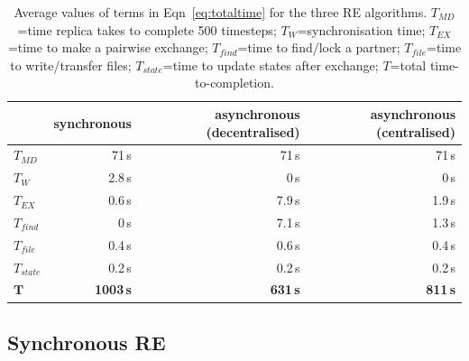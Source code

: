 \documentclass{rspublic}
\newcommand{\alnote}[1]{ {\textcolor{blue} { ***andre: #1 }}}
\newcommand{\athotanote}[1]{ {\textcolor{green} { ***athota: #1 }}}
\newcommand{\alnote}[1]{}
\newcommand{\athotanote}[1]{}
\begin{document}
\begin{table}
    \centering
	\begin{tabular}{|l|r|r|r|}
	\hline
	                        &\textbf{synchronous}  &\textbf{asynchronous (decentralised)} 
	                        &\textbf{asynchronous (centralised)}\\
	\hline
	\hline
	$T_{MD}$       &71\,s &71\,s &71\,s\\
	\hline
	\hline
	$T_{W}$        &2.8\,s &0\,s &0\,s\\
	\hline\hline
	$T_{EX}$        &0.6\,s &7.9\,s &1.9\,s\\
	\hline
	\hspace{2mm}$T_{find}$        &0\,s   &7.1\,s &1.3\,s\\
	\hline
	\hspace{2mm}$T_{file}$       &0.4\,s &0.6\,s &0.4\,s\\
	\hline
    \hspace{2mm}$T_{state}$    &0.2\,s &0.2\,s  &0.2\,s\\
	\hline
	\hline
	$\mathbf{T}$        &\textbf{1003\,s} &\textbf{631\,s}    &\textbf{811\,s}\\
	\hline
    \end{tabular}
    \caption{Average values of terms in Eqn~\ref{eq:totaltime} for the three RE algorithms. $T_{MD}$=time replica takes to complete 500 timesteps; $T_W$=synchronisation time; $T_{EX}$=time to make a pairwise exchange; $T_{find}$=time to find/lock a partner; $T_{file}$=time to write/transfer files; $T_{state}$=time to update states after exchange; $T$=total time-to-completion.} 
	\label{table:repex_perf}
\end{table}

\subsection{Synchronous RE}
\label{sec:impl_sync_re}
\end{document}
